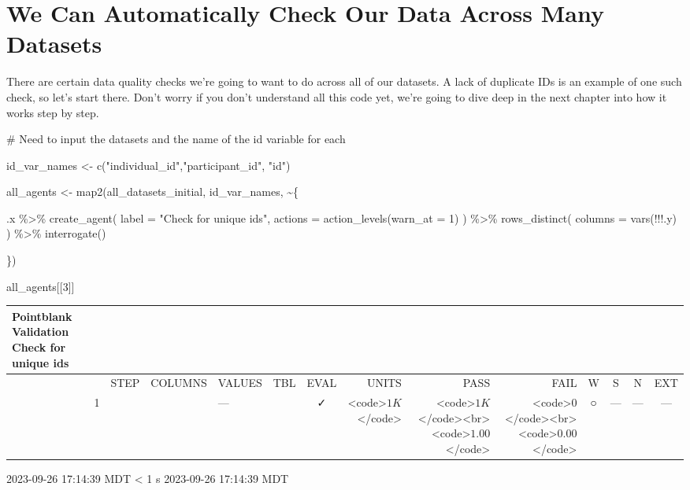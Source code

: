 \documentclass[
  letterpaper,
  DIV=11,
  numbers=noendperiod]{scrreprt}
\newenvironment{Shaded}{\begin{snugshade}}{\end{snugshade}}
\newcommand{\AttributeTok}[1]{\textcolor[rgb]{0.40,0.45,0.13}{#1}}
\newcommand{\CommentTok}[1]{\textcolor[rgb]{0.37,0.37,0.37}{#1}}
\newcommand{\DecValTok}[1]{\textcolor[rgb]{0.68,0.00,0.00}{#1}}
\newcommand{\FunctionTok}[1]{\textcolor[rgb]{0.28,0.35,0.67}{#1}}
\newcommand{\NormalTok}[1]{\textcolor[rgb]{0.00,0.23,0.31}{#1}}
\newcommand{\OtherTok}[1]{\textcolor[rgb]{0.00,0.23,0.31}{#1}}
\newcommand{\SpecialCharTok}[1]{\textcolor[rgb]{0.37,0.37,0.37}{#1}}
\newcommand{\StringTok}[1]{\textcolor[rgb]{0.13,0.47,0.30}{#1}}
\begin{document}
\hypertarget{we-can-automatically-check-our-data-across-many-datasets}{%
\section{We Can Automatically Check Our Data Across Many
Datasets}\label{we-can-automatically-check-our-data-across-many-datasets}}

There are certain data quality checks we're going to want to do across
all of our datasets. A lack of duplicate IDs is an example of one such
check, so let's start there. Don't worry if you don't understand all
this code yet, we're going to dive deep in the next chapter into how it
works step by step.

\begin{Shaded}
\begin{Highlighting}[]
\CommentTok{\# Need to input the datasets and the name of the id variable for each}

\NormalTok{id\_var\_names }\OtherTok{\textless{}{-}} \FunctionTok{c}\NormalTok{(}\StringTok{"individual\_id"}\NormalTok{,}\StringTok{"participant\_id"}\NormalTok{, }\StringTok{"id"}\NormalTok{)}

\NormalTok{all\_agents }\OtherTok{\textless{}{-}} \FunctionTok{map2}\NormalTok{(all\_datasets\_initial, id\_var\_names, }\SpecialCharTok{\textasciitilde{}}\NormalTok{\{}
  
\NormalTok{  .x }\SpecialCharTok{\%\textgreater{}\%}
    \FunctionTok{create\_agent}\NormalTok{(}
      \AttributeTok{label =} \StringTok{"Check for unique ids"}\NormalTok{,}
      \AttributeTok{actions =} \FunctionTok{action\_levels}\NormalTok{(}\AttributeTok{warn\_at =} \DecValTok{1}\NormalTok{)}
\NormalTok{    ) }\SpecialCharTok{\%\textgreater{}\%}
    \FunctionTok{rows\_distinct}\NormalTok{(}
      \AttributeTok{columns =} \FunctionTok{vars}\NormalTok{(}\SpecialCharTok{!!!}\NormalTok{.y)}
\NormalTok{    ) }\SpecialCharTok{\%\textgreater{}\%}
    \FunctionTok{interrogate}\NormalTok{()}
  
\NormalTok{\})}

\NormalTok{all\_agents[[}\DecValTok{3}\NormalTok{]]}
\end{Highlighting}
\end{Shaded}

\setlength{\LTpost}{0mm}
\begin{longtable}{lrlllccrrrcccc}
\caption*{
{\large Pointblank Validation} \\ 
{\small Check for unique ids}
} \\ 
\toprule
 &  & STEP & COLUMNS & VALUES & TBL & EVAL & UNITS & PASS & FAIL & W & S & N & EXT \\ 
\midrule
 & 1 &  &  & — &                                                              & ✓ & <code>$1K$</code> & <code>$1K$</code><br><code>$1.00$</code> & <code>$0$</code><br><code>$0.00$</code> & ○ & --- & --- & --- \\ 
\bottomrule
\end{longtable}
\begin{minipage}{\linewidth}
2023-09-26 17:14:39 MDT
\textless{} 1 s
2023-09-26 17:14:39 MDT\\
\end{minipage}
\end{document}
